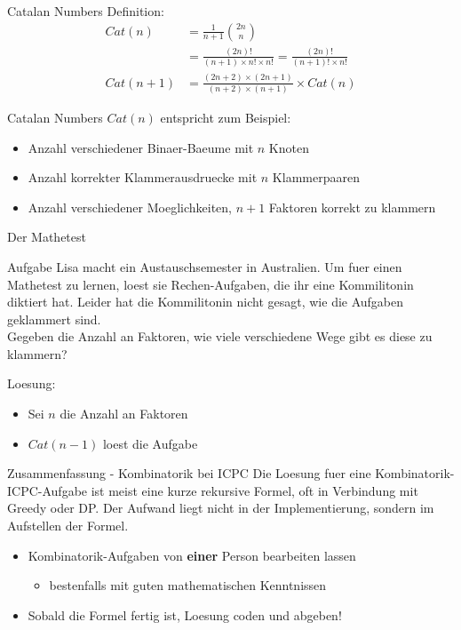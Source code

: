 \documentclass[18pt]{beamer}
\begin{document}
\begin{frame}{Catalan Numbers}
Definition:
\begin{align*}
Cat \left( n \right) &= \frac{1}{n+1} \binom{2n}{n} \\
&= \frac{\left( 2n \right)!}{\left( n+1 \right) \times n! \times n!} = \frac{\left( 2n \right) !}{\left( n+1 \right) ! \times n!} \\
Cat \left( n + 1 \right) &= \frac{\left( 2n + 2 \right) \times \left( 2n + 1 \right)}{\left( n + 2 \right) \times \left( n + 1 \right)} \times Cat \left( n \right)
\end{align*}
\end{frame}

\begin{frame}{Catalan Numbers}
$Cat \left( n \right)$ entspricht zum Beispiel:
\begin{itemize}
\item Anzahl verschiedener Binaer-Baeume mit $n$ Knoten
\item Anzahl korrekter Klammerausdruecke mit $n$ Klammerpaaren
\item Anzahl verschiedener Moeglichkeiten, $n+1$ Faktoren korrekt zu klammern
\end{itemize}
\end{frame}

\begin{frame}{Der Mathetest}
\begin{block}{Aufgabe}
Lisa macht ein Austauschsemester in Australien. Um fuer einen Mathetest zu lernen, loest sie Rechen-Aufgaben, die ihr eine Kommilitonin diktiert hat. Leider hat die Kommilitonin nicht gesagt, wie die Aufgaben geklammert sind. \\
Gegeben die Anzahl an Faktoren, wie viele verschiedene Wege gibt es diese zu klammern?
\end{block}
\pause
Loesung:
\begin{itemize}
\item Sei $n$ die Anzahl an Faktoren
\item $Cat \left( n-1 \right)$ loest die Aufgabe
\end{itemize}
\end{frame}

\begin{frame}{Zusammenfassung - Kombinatorik bei ICPC}
Die Loesung fuer eine Kombinatorik-ICPC-Aufgabe ist meist eine kurze rekursive Formel, oft in Verbindung mit Greedy oder DP. Der Aufwand liegt nicht in der Implementierung, sondern im Aufstellen der Formel.
\pause
\begin{itemize}
\item Kombinatorik-Aufgaben von \textbf{einer} Person bearbeiten lassen
\pause
\begin{itemize}
\item bestenfalls mit guten mathematischen Kenntnissen
\end{itemize}
\pause
\item Sobald die Formel fertig ist, Loesung coden und abgeben!
\end{itemize}
\end{frame}
\end{document}
